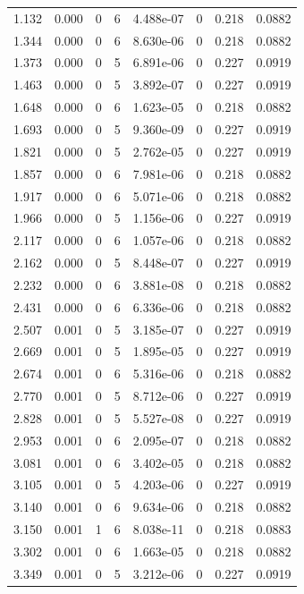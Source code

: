 \documentclass[preview]{standalone}
\begin{document}
{{\begin{tabular}{L{1.2cm}C{1.2cm} C{0.3cm}C{0.5cm} C{1.4cm}C{1.4cm} C{1.4cm}C{1.4cm}}
  1.132  &  0.000  & 0     &  6 &  4.488e-07  & 0  & 0.218 &  0.0882   \\ 
  1.344  &  0.000  & 0     &  6 &  8.630e-06  & 0  & 0.218 &  0.0882   \\ 
  1.373  &  0.000  & 0     &  5 &  6.891e-06  & 0  & 0.227 &  0.0919   \\ 
  1.463  &  0.000  & 0     &  5 &  3.892e-07  & 0  & 0.227 &  0.0919   \\ 
  1.648  &  0.000  & 0     &  6 &  1.623e-05  & 0  & 0.218 &  0.0882   \\ 
  1.693  &  0.000  & 0     &  5 &  9.360e-09  & 0  & 0.227 &  0.0919   \\ 
  1.821  &  0.000  & 0     &  5 &  2.762e-05  & 0  & 0.227 &  0.0919   \\ 
  1.857  &  0.000  & 0     &  6 &  7.981e-06  & 0  & 0.218 &  0.0882   \\ 
  1.917  &  0.000  & 0     &  6 &  5.071e-06  & 0  & 0.218 &  0.0882   \\ 
  1.966  &  0.000  & 0     &  5 &  1.156e-06  & 0  & 0.227 &  0.0919   \\ 
  2.117  &  0.000  & 0     &  6 &  1.057e-06  & 0  & 0.218 &  0.0882   \\ 
  2.162  &  0.000  & 0     &  5 &  8.448e-07  & 0  & 0.227 &  0.0919   \\ 
  2.232  &  0.000  & 0     &  6 &  3.881e-08  & 0  & 0.218 &  0.0882   \\ 
  2.431  &  0.000  & 0     &  6 &  6.336e-06  & 0  & 0.218 &  0.0882   \\ 
  2.507  &  0.001  & 0     &  5 &  3.185e-07  & 0  & 0.227 &  0.0919   \\ 
  2.669  &  0.001  & 0     &  5 &  1.895e-05  & 0  & 0.227 &  0.0919   \\ 
  2.674  &  0.001  & 0     &  6 &  5.316e-06  & 0  & 0.218 &  0.0882   \\ 
  2.770  &  0.001  & 0     &  5 &  8.712e-06  & 0  & 0.227 &  0.0919   \\ 
  2.828  &  0.001  & 0     &  5 &  5.527e-08  & 0  & 0.227 &  0.0919   \\ 
  2.953  &  0.001  & 0     &  6 &  2.095e-07  & 0  & 0.218 &  0.0882   \\ 
  3.081  &  0.001  & 0     &  6 &  3.402e-05  & 0  & 0.218 &  0.0882   \\ 
  3.105  &  0.001  & 0     &  5 &  4.203e-06  & 0  & 0.227 &  0.0919   \\ 
  3.140  &  0.001  & 0     &  6 &  9.634e-06  & 0  & 0.218 &  0.0882   \\ 
  3.150  &  0.001  & 1     &  6 &  8.038e-11  & 0  & 0.218 &  0.0883   \\ 
  3.302  &  0.001  & 0     &  6 &  1.663e-05  & 0  & 0.218 &  0.0882   \\ 
  3.349  &  0.001  & 0     &  5 &  3.212e-06  & 0  & 0.227 &  0.0919   \\ 
\hline 
\end{tabular} 

}}
\end{document}
